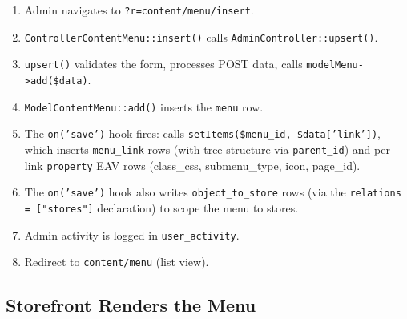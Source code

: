 \documentclass[11pt,a4paper]{article}
\begin{document}
\begin{enumerate}[leftmargin=1.6em,itemsep=2pt]
  \item Admin navigates to \texttt{?r=content/menu/insert}.
  \item \texttt{ControllerContentMenu::insert()} calls
        \texttt{AdminController::upsert()}.
  \item \texttt{upsert()} validates the form, processes POST data,
        calls \texttt{modelMenu->add(\$data)}.
  \item \texttt{ModelContentMenu::add()} inserts the \texttt{menu} row.
  \item The \texttt{on('save')} hook fires: calls
        \texttt{setItems(\$menu\_id, \$data['link'])}, which inserts
        \texttt{menu\_link} rows (with tree structure via
        \texttt{parent\_id}) and per-link \texttt{property} EAV rows
        (class\_css, submenu\_type, icon, page\_id).
  \item The \texttt{on('save')} hook also writes
        \texttt{object\_to\_store} rows (via the \texttt{relations =
        ["stores"]} declaration) to scope the menu to stores.
  \item Admin activity is logged in \texttt{user\_activity}.
  \item Redirect to \texttt{content/menu} (list view).
\end{enumerate}

\subsection{Storefront Renders the Menu}
\end{document}
